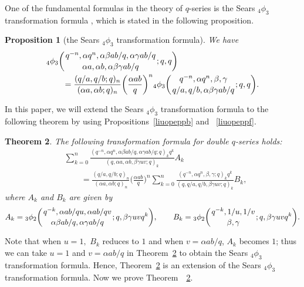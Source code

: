 \documentclass[10pt,a4paper]{amsart}
\numberwithin{equation}{section}
\newtheorem{Theorem}{Theorem}[section]
\newtheorem{Proposition}[Theorem]{Proposition}
 { \theoremstyle{definition}
\newtheorem{Definition}[Theorem]{Definition}
\newtheorem{Note}[Theorem]{Note}
\newtheorem{Example}[Theorem]{Example}
\newtheorem{Remark}[Theorem]{Remark} }
\begin{document}
One of the fundamental formulas in the theory of $q$-series is the Sears $_4\phi_3$ transformation formula \cite[p.~49, equation~(2.10.4)]{Gas+Rah},
which is stated in the following proposition.
\begin{Proposition}[the Sears $_4\phi_3$ transformation formula]\label{Searstrs}
	We have
	\begin{align*}
		&{_4 \phi_3} \biggl({{q^{-n}, \alpha q^n, \alpha \beta ab/q, \alpha \gamma ab/q}
			\atop{\alpha a, \alpha b,\alpha \beta \gamma ab/q}}; q, q\biggr)\\
		&\qquad{}=\frac{(q/a, q/b; q)_n}{(\alpha a, \alpha b; q)_n}
		\biggl(\frac{\alpha ab}{q}\biggr)^n
		{_4 \phi_3} \biggl({{q^{-n}, \alpha q^n, \beta, \gamma}
			\atop{q/a, q/b,\alpha \beta \gamma ab/q}}; q, q\biggr).
	\end{align*}
\end{Proposition}
In this paper, we will extend the Sears $_4\phi_3$ transformation formula to the following theorem by using Propositions~\ref{liuopeppb} and ~\ref{liuopeppf}.
\begin{Theorem}\label{ExtSearstrs} The following transformation formula
	for double $q$-series holds:
	\begin{align*}
		&\sum_{k=0}^{n} \frac{(q^{-n}, \alpha q^n, \alpha \beta ab/q, \alpha \gamma ab/q ; q)_k q^k}
		{(q, \alpha a, \alpha b, \beta \gamma uv; q)_k} A_k\\
		&\qquad{}=\frac{(q/a, q/b; q)_n}{(\alpha a, \alpha b; q)_n}
		\biggl(\frac{\alpha ab}{q}\biggr)^n
		\sum_{k=0}^{n} \frac{(q^{-n}, \alpha q^n, \beta, \gamma; q)_k q^k}{(q, q/a, q/b, \beta \gamma uv; q)_k}B_k,
	\end{align*}
	where $A_k$ and $B_k$ are given by
	\begin{equation*}
		A_k= {_3\phi_2} \biggl({{q^{-k}, \alpha ab/qu, \alpha ab/qv}
			\atop{\alpha \beta ab/q, \alpha \gamma ab/q }}; q, \beta \gamma uv q^k \biggr),\qquad
		B_k={_3\phi_2 \biggl({{q^{-k}, 1/u, 1/v}\atop{\beta, \gamma}}; q, \beta \gamma uv q^k\biggr)}.
	\end{equation*}
\end{Theorem}
Note that when $u=1,$ $B_k$ reduces to $1$ and when $v=\alpha ab/q$, $A_k$ becomes $1$; thus we
can take $u=1$ and $v=\alpha ab/q$ in Theorem~\ref{ExtSearstrs} to obtain the Sears $_4\phi_3$ transformation formula. Hence, Theorem~\ref{ExtSearstrs} is an extension of the Sears $_4\phi_3$ transformation formula.
Now we prove Theorem~~\ref{ExtSearstrs}.
\end{document}
